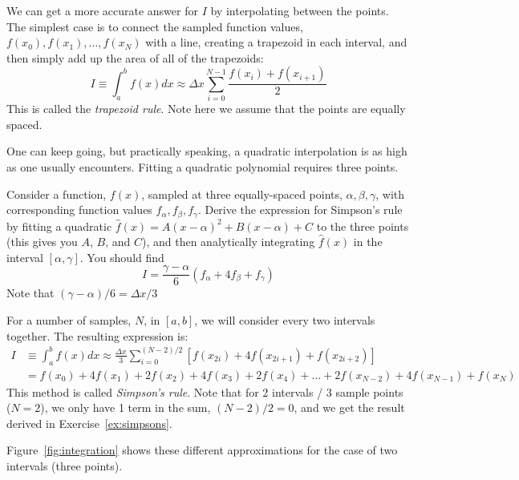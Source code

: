 We can get a more accurate answer for $I$ by interpolating between the
points.  The simplest case is to connect the sampled function values,
$f(x_0), f(x_1), \ldots, f(x_N)$ with a line, creating a trapezoid in
each interval, and then simply add up the area of all of the
trapezoids:
\begin{equation}
I \equiv \int_a^b f(x) dx \approx 
  \Delta x \sum_{i = 0}^{N-1} \frac{f(x_i) + f(x_{i+1})}{2}
\end{equation}
This is called the {\em trapezoid rule}.  Note here we assume that
the points are equally spaced.

One can keep going, but practically speaking, a quadratic interpolation
is as high as one usually encounters.  Fitting a quadratic polynomial 
requires three points.

\begin{exercise}
\label{ex:simpsons}
Consider a function, $f(x)$, sampled at three equally-spaced points,
$\alpha, \beta, \gamma$, with corresponding function values $f_\alpha,
f_\beta, f_\gamma$.  Derive the expression for Simpson's rule by
fitting a quadratic $\hat{f}(x) = A(x - \alpha)^2 + B(x - \alpha) + C$
to the three points (this gives you $A$, $B$, and $C$), and then
analytically integrating $\hat{f}(x)$ in the interval
$[\alpha,\gamma]$.  You should find
\begin{equation}
I = \frac{\gamma-\alpha}{6} (f_\alpha + 4f_\beta + f_\gamma)
\end{equation}
Note that $(\gamma-\alpha)/6 = \Delta x/3$
\end{exercise}

For a number of samples, $N$, in $[a,b]$, we will
consider every two intervals together.  The resulting expression is:
\begin{align}
I &\equiv \int_a^b f(x) dx 
\approx  \frac{\Delta x}{3} \sum_{i = 0}^{(N-2)/2} \left [f(x_{2i}) + 4 f(x_{2i+1}) + f(x_{2i+2}) \right ] \\
&= f(x_0) + 4f(x_1) + 2f(x_2) + 4f(x_3) + 2f(x_4) + \ldots + \nonumber 2f(x_{N-2}) + 4f(x_{N-1}) + f(x_N)
\end{align}
This method is called {\em Simpson's rule}.  Note that for 2 intervals
/ 3 sample points ($N=2$), we only have 1 term in the sum, $(N-2)/2 =
0$, and we get the result derived in Exercise~\ref{ex:simpsons}.


Figure~\ref{fig:integration} shows
these different approximations for the case of two intervals (three points).

